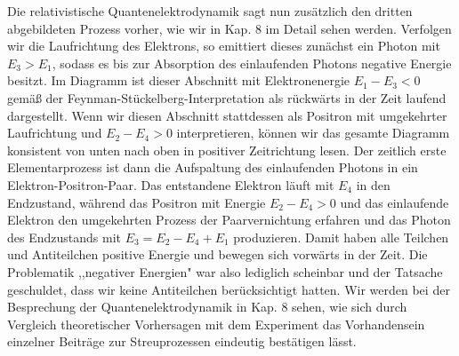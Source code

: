 \documentclass[10pt, letterpaper]{article}
\begin{document}
Die relativistische Quantenelektrodynamik sagt nun zusätzlich den dritten abgebildeten Prozess vorher, wie wir in Kap. 8 im Detail sehen werden. Verfolgen wir die Laufrichtung des Elektrons, so emittiert dieses zunächst ein Photon mit $E_{3}>E_{1}$, sodass es bis zur Absorption des einlaufenden Photons negative Energie besitzt. Im Diagramm ist dieser Abschnitt mit Elektronenergie $E_{1}-E_{3}<0$ gemäß der Feynman-Stückelberg-Interpretation als rückwärts in der Zeit laufend dargestellt. Wenn wir diesen Abschnitt stattdessen als Positron mit umgekehrter Laufrichtung und $E_{2}-E_{4}>0$ interpretieren, können wir das gesamte Diagramm konsistent von unten nach oben in positiver Zeitrichtung lesen. Der zeitlich erste Elementarprozess ist dann die Aufspaltung des einlaufenden Photons in ein Elektron-Positron-Paar. Das entstandene Elektron läuft mit $E_{4}$ in den Endzustand, während das Positron mit Energie $E_{2}-E_{4}>0$ und das einlaufende Elektron den umgekehrten Prozess der Paarvernichtung erfahren und das Photon des Endzustands mit $E_{3}=E_{2}-E_{4}+E_{1}$ produzieren. Damit haben alle Teilchen und Antiteilchen positive Energie und bewegen sich vorwärts in der Zeit. Die Problematik ,,negativer Energien" war also lediglich scheinbar und der Tatsache geschuldet, dass wir keine Antiteilchen berücksichtigt hatten. Wir werden bei der Besprechung der Quantenelektrodynamik in Kap. 8 sehen, wie sich durch Vergleich theoretischer Vorhersagen mit dem Experiment das Vorhandensein einzelner Beiträge zur Streuprozessen eindeutig bestätigen lässt.
\end{document}
